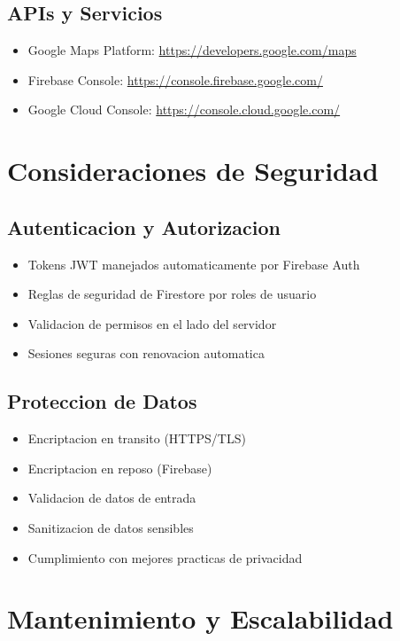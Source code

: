\documentclass[12pt,a4paper]{article}
\begin{document}
\subsection{APIs y Servicios}
\begin{itemize}[itemsep=0.5em]
    \item Google Maps Platform: \url{https://developers.google.com/maps}
    \item Firebase Console: \url{https://console.firebase.google.com/}
    \item Google Cloud Console: \url{https://console.cloud.google.com/}
\end{itemize}

\section{Consideraciones de Seguridad}

\subsection{Autenticacion y Autorizacion}
\begin{itemize}[itemsep=0.5em]
    \item Tokens JWT manejados automaticamente por Firebase Auth
    \item Reglas de seguridad de Firestore por roles de usuario
    \item Validacion de permisos en el lado del servidor
    \item Sesiones seguras con renovacion automatica
\end{itemize}

\subsection{Proteccion de Datos}
\begin{itemize}[itemsep=0.5em]
    \item Encriptacion en transito (HTTPS/TLS)
    \item Encriptacion en reposo (Firebase)
    \item Validacion de datos de entrada
    \item Sanitizacion de datos sensibles
    \item Cumplimiento con mejores practicas de privacidad
\end{itemize}

\section{Mantenimiento y Escalabilidad}
\end{document}
